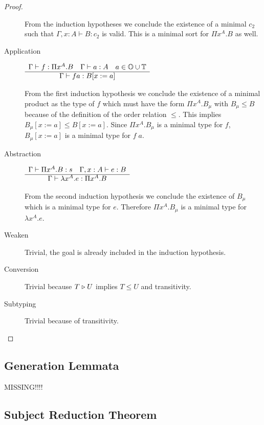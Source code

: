 \begin{theorem}
\begin{proof}
\begin{description}
      From the induction hypotheses we conclude the existence of a minimal
      $c_2$ such that $\Gamma,x:A \vdash B: c_2$ is valid. This is a minimal
      sort for $\Pi x^A. B$ as well.

    \item[Application]
      $\begin{array}{c} \Gamma \vdash f: \Pi x^A.B \quad
        \Gamma \vdash a:A
        \quad a \in \mathbb{O} \cup \mathbb{T}
       \\ \hline \Gamma \vdash f a : B[x:=a]\end{array}
      $

      From the first induction hypothesis we conclude the existence of a
      minimal product as the type of $f$ which must have the form
      $\Pi x^A.B_\mu$ with $B_\mu \le B$ because of the definition of the
      order relation $\le$.
      This implies $B_\mu[x:=a] \le B[x:=a]$. Since $\Pi x^A. B_\mu$ is a
      minimal type for $f$, $B_\mu[x:=a]$ is a minimal type for $f\; a$.

    \item[Abstraction]
      $\begin{array}{c} \Gamma \vdash \Pi x^A.B: s \quad
        \Gamma,x:A \vdash e:B
       \\ \hline \Gamma \vdash \lambda x^A.e : \Pi x^A . B\end{array}
      $

      From the second induction hypothesis we conclude the existence of
      $B_\mu$ which is a minimal type for $e$. Therefore $\Pi x^A. B_\mu$ is
      a minimal type for $\lambda x^A.e$.


    \item[Weaken] Trivial, the goal is already included in the induction
      hypothesis.

    \item[Conversion] Trivial because $T \mathrel{\triangleright} U$ implies $T \le U$ and
      transitivity.

    \item[Subtyping] Trivial because of transitivity.
    \end{description}
  \end{proof}
\end{theorem}








\subsection{Generation Lemmata}

MISSING!!!!






\subsection{Subject Reduction Theorem}

